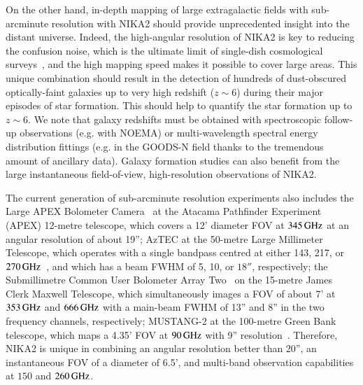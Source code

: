 \documentclass[traditionalabstract]{aa}
\newcommand{\lp}[1]{#1}
\newcommand{\rev}[1]{#1}
\begin{document}
On the other hand, in-depth mapping of large extragalactic fields with
sub-arcminute resolution with NIKA2 should provide unprecedented insight
into the distant universe. 
{\lp Indeed, the high-angular resolution of NIKA2 is key to reducing the
confusion noise, which is the ultimate limit of single-dish cosmological
surveys~\citep{Bethermin2017_simu}, and the high mapping speed makes it possible to cover large areas.}
{\rev This unique combination should result in the detection of hundreds of
dust-obscured optically-faint galaxies up to very high redshift
($z \sim 6$) during their major episodes of star formation.}
This should help to quantify the star formation up to $z \sim 6$.
{\rev We note that galaxy redshifts  must be obtained with
spectroscopic follow-up observations (e.g. with NOEMA) or
multi-wavelength spectral energy distribution fittings
(e.g. in the GOODS-N field thanks to the tremendous amount of
ancillary data). Galaxy formation studies can also
benefit from the large instantaneous field-of-view, high-resolution
observations of NIKA2.}


The current generation of sub-arcminute resolution experiments also
includes the Large APEX Bolometer Camera~\citep[LABOCA,][]{Siringo2009_LABOCA} at the Atacama
Pathfinder Experiment (APEX) 12-metre telescope, which covers a
12' diameter FOV at $345\, \rm{GHz}$ {\lp at an angular resolution of about
19''}; AzTEC at the 50-metre Large Millimeter Telescope, which operates with a
single bandpass centred at either 143, 217, or
$270\,\rm{GHz}$~\citep{Wilson2008_AZTEC}, {\lp and which has a beam
FWHM of 5, 10, or $18''$, respectively}; the Submillimetre Common User Bolometer
Array Two~\citep[SCUBA-2,][]{Holland2013_SCUBA2,Dempsey2013_SCUBA2} on the
15-metre James Clerk Maxwell Telescope, which simultaneously
images a FOV of about 7' at $353\,\rm{GHz}$ and $666\,\rm{GHz}$ {\lp with a main-beam FWHM of 13''
and 8'' in the two frequency channels, respectively;}
 MUSTANG-2 at the 100-metre Green Bank telescope,
which maps a 4.35' FOV at 
$90\,\rm{GHz}$ {\lp with 9'' resolution}~\citep{Dicker2014_MUSTANG2, Stanchfield2016_MUSTANG2}.
Therefore, NIKA2 is unique
in combining an angular resolution better than 20'', an instantaneous FOV of a
diameter of 6.5', and multi-band observation capabilities at $150$ and
$260\,\rm{GHz}$.
\end{document}

